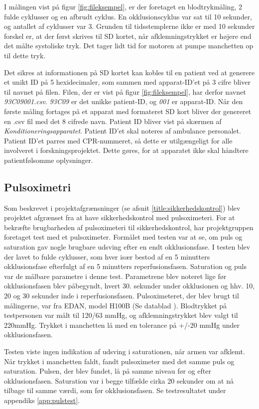 I målingen vist på figur \ref{fig:fileksempel}, er der foretaget en blodtrykmåling, 2 fulde cyklusser og en afbrudt cyklus. En okklusionscyklus var sat til 10 sekunder, og antallet af cyklusser var 3. Grunden til tidsstemplerne ikke er med 10 sekunder forskel er, at der først skrives til SD kortet, når afklemningstrykket er højere end det målte systoliske tryk. Det tager lidt tid for motoren at pumpe manchetten op til dette tryk. 

Det sikres at informationen på SD kortet kan kobles til en patient ved at generere et unikt ID på 5 hexidecimaler, som sammen med apparat-ID'et på 3 cifre bliver til navnet på filen. Filen, der er vist på figur \ref{fig:fileksempel}, har derfor navnet \textit{93C09001.csv}. \textit{93C09} er det unikke patient-ID, og \textit{001} er apparat-ID. Når den første måling fortages på et apparat med formateret SD kort bliver der genereret en .csv fil med det 8 cifrede navn. Patient ID bliver vist på skærmen af \textit{Konditioneringsapparatet}. Patient ID'et skal noteres af ambulance personalet. Patient ID'et parres med CPR-nummeret, så dette er utilgængeligt for alle involveret i forskningsprojektet. Dette gøres, for at apparatet ikke skal håndtere patientfølsomme oplysninger.

\subsection{Pulsoximetri} \label{title:pulsOxi}
Som beskrevet i projektafgrænsninger (se afsnit \ref{title:sikkerhedskontrol}) blev projektet afgrænset fra at have sikkerhedskontrol med pulsoximeteri. For at bekræfte brugbarheden af pulsoximeteri til sikkerhedskontrol, har projektgruppen foretaget test med et pulsoximeter. Formålet med testen var at se, om puls og saturation gav nogle brugbare udsving efter en endt okklusionsfase. I testen blev der lavet to fulde cyklusser, som hver især bestod af en 5 minutters okklusionsfase efterfulgt af en 5 minutters reperfusionsfasen. Saturation og puls var de målbare parametre i denne test. Parametrene blev noteret lige før okklusionsfasen blev påbegyndt, hvert 30. sekunder under okklusionen og hhv. 10, 20 og 30 sekunder inde i reperfusionsfasen. Pulsoximeteret, der blev brugt til målingerne, var fra EDAN, model H100B (Se datablad \cite{RefWorks:30}). Blodtrykket på testpersonen var målt til 120/63 mmHg, og afklemningstrykket blev valgt til 220mmHg. Trykket i manchetten lå med en tolerance på +/-20 mmHg under okklusionsfasen. 

Testen viste ingen indikation af udsving i saturationen, når armen var afklemt. Når trykket i manchetten faldt, fandt pulsoximeter med det samme puls og saturation. Pulsen, der blev fundet, lå på samme niveau før og efter okklusionsfasen. Saturation var i begge tilfælde cirka 20 sekunder om at nå tilbage til samme værdi, som før okklusionsfasen. Se testresultatet under appendiks \ref{app:pulstest}.

